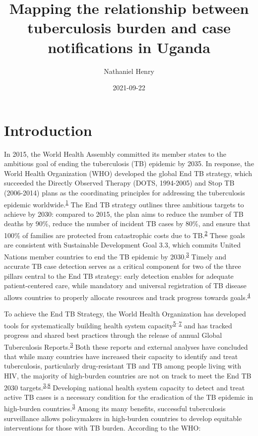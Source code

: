 \documentclass[
]{article}
\title{Mapping the relationship between tuberculosis burden and case notifications in Uganda}
\author{Nathaniel Henry\textsuperscript{}}
\date{2021-09-22}
\begin{document}
\maketitle

\hypertarget{introduction}{%
\section{Introduction}\label{introduction}}

In 2015, the World Health Assembly committed its member states to the ambitious goal of ending the tuberculosis (TB) epidemic by 2035. In response, the World Health Organization (WHO) developed the global End TB strategy, which succeeded the Directly Observed Therapy (DOTS, 1994-2005) and Stop TB (2006-2014) plans as the coordinating principles for addressing the tuberculosis epidemic worldwide.\textsuperscript{\protect\hyperlink{ref-Onozaki2010}{1}} The End TB strategy outlines three ambitious targets to achieve by 2030: compared to 2015, the plan aims to reduce the number of TB deaths by 90\%, reduce the number of incident TB cases by 80\%, and ensure that 100\% of families are protected from catastrophic costs due to TB.\textsuperscript{\protect\hyperlink{ref-WorldHealthOrganization2015a}{2}} These goals are consistent with Sustainable Development Goal 3.3, which commits United Nations member countries to end the TB epidemic by 2030.\textsuperscript{\protect\hyperlink{ref-WorldHealthOrganization2019}{3}} Timely and accurate TB case detection serves as a critical component for two of the three pillars central to the End TB strategy: early detection enables for adequate patient-centered care, while mandatory and universal registration of TB disease allows countries to properly allocate resources and track progress towards goals.\textsuperscript{\protect\hyperlink{ref-WorldHealthOrganization2015}{4}}

To achieve the End TB Strategy, the World Health Organization has developed tools for systematically building health system capacity\textsuperscript{\protect\hyperlink{ref-WHOWorldHealthOrganization2008}{5}--\protect\hyperlink{ref-WorldHealthOrganization2010}{7}} and has tracked progress and shared best practices through the release of annual Global Tuberculosis Reports.\textsuperscript{\protect\hyperlink{ref-WorldHealthOrganization2019}{3}} Both these reports and external analyses have concluded that while many countries have increased their capacity to identify and treat tuberculosis, particularly drug-resistant TB and TB among people living with HIV, the majority of high-burden countries are not on track to meet the End TB 2030 targets.\textsuperscript{\protect\hyperlink{ref-WorldHealthOrganization2019}{3},\protect\hyperlink{ref-Kyu2018}{8}} Developing national health system capacity to detect and treat active TB cases is a necessary condition for the eradication of the TB epidemic in high-burden countries.\textsuperscript{\protect\hyperlink{ref-WorldHealthOrganization2019}{3}} Among its many benefits, successful tuberculosis surveillance allows policymakers in high-burden countries to develop equitable interventions for those with TB burden. According to the WHO:
\end{document}
